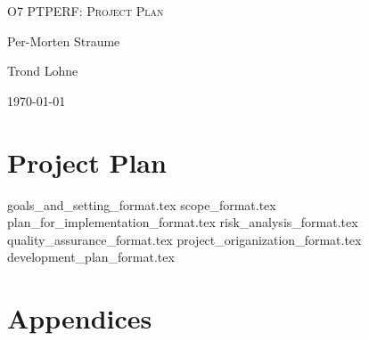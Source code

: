 \documentclass[hidelinks]{article}
\begin{document}

\begin{titlepage}
    \centering
    {\scshape\LARGE O7 PTPERF: Project Plan \par}
    \vspace{2cm}
    {Per-Morten Straume \par}
    {Trond Lohne \par}
    \vfill
    {\large \today\par}
\end{titlepage}

\pagebreak
\tableofcontents

\section*{Project Plan}
{goals_and_setting_format.tex}
{scope_format.tex}
{plan_for_implementation_format.tex}
{risk_analysis_format.tex}
{quality_assurance_format.tex}
{project_origanization_format.tex}
{development_plan_format.tex}

\pagebreak



\pagebreak
\section*{Appendices}
\end{document}

